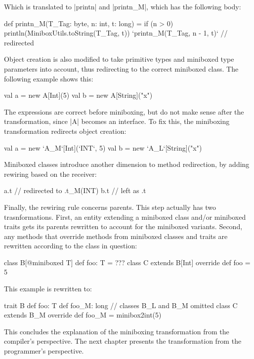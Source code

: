 Which is translated to |printn| and |printn_M|, which has the following body:

\begin{lstlisting-nobreak}
 def printn_M(T_Tag: byte, n: int, t: long) =
   if (n > 0) {
     println(MiniboxUtils.toString(T_Tag, t))
     `printn_M(T_Tag, n - 1, t)` // redirected
   }
\end{lstlisting-nobreak}

Object creation is also modified to take primitive types and miniboxed type parameters into account, thus redirecting to the correct miniboxed class. The following example shows this:

\begin{lstlisting-nobreak}
 val a = new A[Int](5)
 val b = new A[String]("x")
\end{lstlisting-nobreak}

The expressions are correct before miniboxing, but do not make sense after the transformation, since |A| becomes an interface. To fix this, the miniboxing transformation redirects object creation:

\begin{lstlisting-nobreak}
 val a = new `A_M`[Int](`INT`, 5)
 val b = new `A_L`[String]("x")
\end{lstlisting-nobreak}

Miniboxed classes introduce another dimension to method redirection, by adding rewiring based on the receiver:

\begin{lstlisting-nobreak}
  a.t // redirected to .t_M(INT)
  b.t // left as .t
\end{lstlisting-nobreak}

Finally, the rewiring rule concerns parents. This step actually has two trasnformations. First, an entity extending a miniboxed class and/or miniboxed traits gets its parents rewritten to account for the miniboxed variants. Second, any methods that override methods from miniboxed classes and traits are rewritten according to the class in question:

\begin{lstlisting-nobreak}
  class B[@miniboxed T]   { def foo: T = ??? }
  class C extends B[Int] { override def foo = 5 }
\end{lstlisting-nobreak}

This example is rewritten to:

\begin{lstlisting-nobreak}
  trait B {
    def foo: T
    def foo_M: long
  }
  // classes B_L and B_M omitted
  class C extends B_M {
    override def foo_M = minibox2int(5)
  }
\end{lstlisting-nobreak}

This concludes the explanation of the miniboxing transformation from the compiler's perspective. The next chapter presents the transformation from the programmer's perspective.
